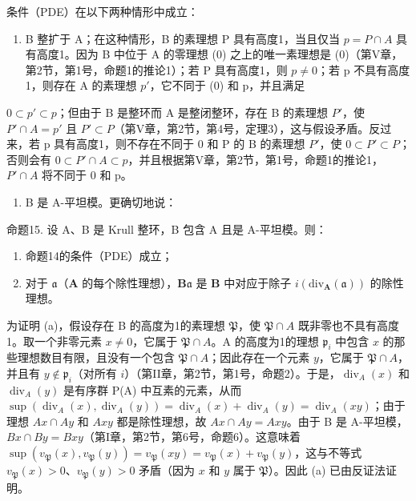 条件（PDE）在以下两种情形中成立：

\begin{enumerate}
\def\labelenumi{(\arabic{enumi})}
\tightlist
\item
  B 整扩于 A；在这种情形，B 的素理想 P 具有高度1，当且仅当 \(p = P \cap A\) 具有高度1。因为 B 中位于 A 的零理想 (0) 之上的唯一素理想是 (0)（第V章，第2节，第1号，命题1的推论1）；若 P 具有高度1，则 \(p \neq 0\)；若 p 不具有高度1，则存在 A 的素理想 \(p'\)，它不同于 (0) 和 p，并且满足
\end{enumerate}

\(0 \subset p' \subset p\)；但由于 B 是整环而 A 是整闭整环，存在 B 的素理想 \(P'\)，使 \(P' \cap A = p'\) 且 \(P' \subset P\)（第V章，第2节，第4号，定理3），这与假设矛盾。反过来，若 p 具有高度1，则不存在不同于 0 和 P 的 B 的素理想 \(P'\)，使 \(0 \subset P' \subset P\)；否则会有 \(0 \subset P' \cap A \subset p\)，并且根据第V章，第2节，第1号，命题1的推论1，\(P' \cap A\) 将不同于 0 和 p。

\begin{enumerate}
\def\labelenumi{(\arabic{enumi})}
\setcounter{enumi}{1}
\tightlist
\item
  B 是 A-平坦模。更确切地说：
\end{enumerate}

命题15. 设 A、B 是 Krull 整环，B 包含 A 且是 A-平坦模。则：

\begin{enumerate}
\def\labelenumi{(\alph{enumi})}
\item
  命题14的条件（PDE）成立；
\item
  对于 \(\mathfrak{a}\)（\(\mathbf{A}\) 的每个除性理想），\(\mathbf{B}\mathfrak{a}\) 是 \(\mathbf{B}\) 中对应于除子 \(i(\mathrm{div}_{\mathbf{A}}(\mathfrak{a}))\) 的除性理想。
\end{enumerate}

为证明 (a)，假设存在 B 的高度为1的素理想 \(\mathfrak{P}\)，使 \(\mathfrak{P} \cap A\) 既非零也不具有高度1。取一个非零元素 \(x \neq 0\)，它属于 \(\mathfrak{P} \cap A\)。A 的高度为1的理想 \(\mathfrak{p}_i\) 中包含 \(x\) 的那些理想数目有限，且没有一个包含 \(\mathfrak{P} \cap A\)；因此存在一个元素 \(y\)，它属于 \(\mathfrak{P} \cap A\)，并且有 \(y \notin \mathfrak{p}_i\)（对所有 \(i\)）（第II章，第2节，第1号，命题2）。于是，\(\operatorname{div}_{A}(x)\) 和 \(\operatorname{div}_{A}(y)\) 是有序群 P(A) 中互素的元素，从而 \(\sup (\operatorname{div}_{A}(x), \operatorname{div}_{A}(y)) = \operatorname{div}_{A}(x) + \operatorname{div}_{A}(y) = \operatorname{div}_{A}(xy)\)；由于理想 \(Ax \cap Ay\) 和 \(Axy\) 都是除性理想，故 \(Ax \cap Ay = Axy\)。由于 B 是 A-平坦模，\(Bx \cap By = Bxy\)（第I章，第2节，第6号，命题6）。这意味着 \(\sup (v_{\mathfrak{P}}(x), v_{\mathfrak{P}}(y)) = v_{\mathfrak{P}}(xy) = v_{\mathfrak{P}}(x) + v_{\mathfrak{P}}(y)\)，这与不等式 \(v_{\mathfrak{P}}(x) > 0\)、\(v_{\mathfrak{P}}(y) > 0\) 矛盾（因为 \(x\) 和 \(y\) 属于 \(\mathfrak{P}\)）。因此 (a) 已由反证法证明。

